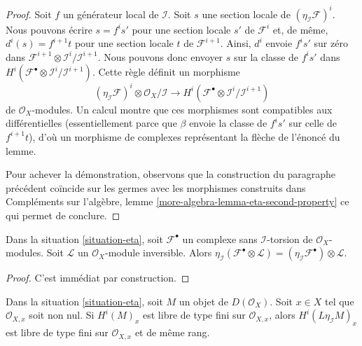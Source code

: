 {\begin{proof}
\medskip\noindent

Soit $f$ un générateur local de $\mathcal{I}$. Soit $s$ une section locale de $(\eta_\mathcal{I}\mathcal{F})^i$. Nous pouvons écrire $s = f^is'$ pour une section locale $s'$ de
$\mathcal{F}^i$ et, de même, $d^i(s) = f^{i + 1}t$ pour une section locale $t$ de $\mathcal{F}^{i + 1}$. Ainsi, $d^i$ envoie $f^is'$
sur zéro dans $\mathcal{F}^{i + 1} \otimes \mathcal{I}^i/\mathcal{I}^{i + 1}$. Nous pouvons donc envoyer $s$ sur la classe de $f^is'$ dans
$H^i(\mathcal{F}^\bullet \otimes \mathcal{I}^i/\mathcal{I}^{i + 1})$. Cette règle définit un morphisme
$$
(\eta_\mathcal{I}\mathcal{F})^i \otimes \mathcal{O}_X/\mathcal{I}
\longrightarrow
H^i(\mathcal{F}^\bullet \otimes \mathcal{I}^i/\mathcal{I}^{i + 1})
$$
de $\mathcal{O}_X$-modules. Un calcul montre que ces morphismes sont compatibles aux différentielles (essentiellement parce que $\beta$
envoie la classe de $f^is'$ sur celle de $f^{i + 1}t$), d'où un morphisme de complexes représentant la flèche de l'énoncé du lemme.

\medskip\noindent

Pour achever la démonstration, observons que la construction du paragraphe précédent coïncide sur les germes avec les morphismes construits dans Compléments sur l'algèbre, lemme
\ref{more-algebra-lemma-eta-second-property}
ce qui permet de conclure.

\end{proof}

\begin{lemma}

\label{lemma-eta-tensor-invertible}
Dans la situation \ref{situation-eta}, soit $\mathcal{F}^\bullet$ un complexe sans $\mathcal{I}$-torsion de $\mathcal{O}_X$-modules. Soit $\mathcal{L}$ un $\mathcal{O}_X$-module inversible. Alors $\eta_\mathcal{I}(\mathcal{F}^\bullet \otimes \mathcal{L}) =
(\eta_\mathcal{I}\mathcal{F}^\bullet) \otimes \mathcal{L}$.
\end{lemma}

\begin{proof}
C'est immédiat par construction.
\end{proof}

\begin{lemma}

\label{lemma-eta-cohomology-locally-free}
Dans la situation \ref{situation-eta}, soit $M$ un objet de $D(\mathcal{O}_X)$. Soit $x \in X$ tel que $\mathcal{O}_{X, x}$ soit non nul. Si $H^i(M)_x$ est libre de type fini sur $\mathcal{O}_{X, x}$, alors $H^i(L\eta_\mathcal{I}M)_x$ est libre de type fini sur $\mathcal{O}_{X, x}$ et de même rang.
\end{lemma}

}
